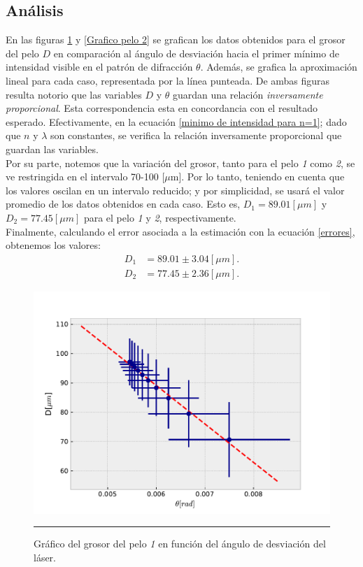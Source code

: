 \documentclass[10pt,a4paper]{article}
\begin{document}
	\begin{multicols}{2}
			
	\section{Análisis}
	En las figuras \ref{Grafico pelo 1} y \ref{Grafico pelo 2} se grafican los datos obtenidos para el grosor del pelo $D$ en comparación al ángulo de desviación hacia el primer mínimo de intensidad visible en el patrón de difracción $\theta$. Además, se grafica la aproximación lineal para cada caso, representada por la línea punteada. De ambas figuras resulta notorio que las variables $D$ y $\theta$ guardan una relación \emph{inversamente proporcional}. Esta correspondencia esta en concordancia con el resultado esperado. Efectivamente, en la ecuación \ref{minimo de intensidad para n=1}; dado que $n$ y $\lambda$ son constantes, se verifica la relación inversamente proporcional que guardan las variables.\\
	
	Por su parte, notemos que la variación del grosor, tanto para el pelo \textit{1} como \textit{2}, se ve restringida en el intervalo 70-100 [$\mu$m]. Por lo tanto, teniendo en cuenta que los valores oscilan en un intervalo reducido; y por simplicidad, se usará el valor promedio de los datos obtenidos en cada caso. Esto es, $D_1 = 89.01 [\mu m]$ y $D_2 = 77.45 [\mu m]$ para el pelo \textit{1} y \textit{2}, respectivamente.\\
	
	Finalmente, calculando el error asociada a la estimación con la ecuación \ref{errores}, obtenemos los valores:
	\begin{align}
	D_1 &= 89.01 \pm 3.04 [\mu m]. \\
	D_2 &= 77.45 \pm 2.36 [\mu m].
	\end{align}
 \begin{figure}[H]
		\centering
		\includegraphics[scale=0.4]{Pelo_1.pdf}
		\caption{Gráfico del grosor del pelo \textit{1} en función del ángulo de desviación del láser. }
		\label{Grafico pelo 1}
		\rule{80mm}{0.1mm}
	\end{figure}
	

\end{multicols}
\end{document}
